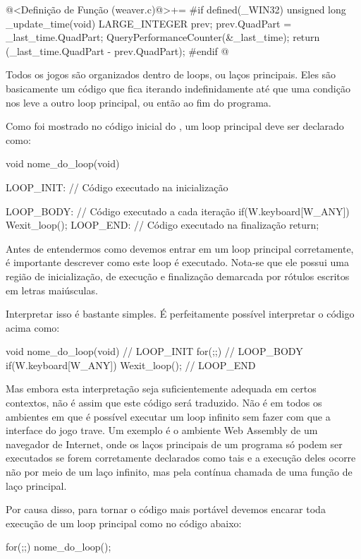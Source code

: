 \iniciocodigo
@<Definição de Função (weaver.c)@>+=
#if defined(_WIN32)
unsigned long _update_time(void){
  LARGE_INTEGER prev;
  prev.QuadPart = _last_time.QuadPart;
  QueryPerformanceCounter(&_last_time);
  return (_last_time.QuadPart - prev.QuadPart);
}
#endif
@
\fimcodigo


Todos os jogos são organizados dentro de loops, ou laços
principais. Eles são basicamente um código que fica iterando
indefinidamente até que uma condição nos leve a outro loop principal,
ou então ao fim do programa.

Como foi mostrado no código inicial do , um loop
principal deve ser declarado como:

\alinhaverbatim
void nome\_do\_loop(void){
 LOOP\_INIT: // Código executado na inicialização

 LOOP\_BODY: // Código executado a cada iteração
    if(W.keyboard[W\_ANY])
        Wexit\_loop();
 LOOP\_END: // Código executado na finalização
    return;
}
\alinhanormal

Antes de entendermos como devemos entrar em um loop principal
corretamente, é importante descrever como este loop é
executado. Nota-se que ele possui uma região de inicialização, de
execução e finalização demarcada por rótulos escritos em letras
maiúsculas.

Interpretar isso é bastante simples. É perfeitamente possível
interpretar o código acima como:

\alinhaverbatim
void nome\_do\_loop(void){
  // LOOP\_INIT
  for(;;){
    // LOOP\_BODY
    if(W.keyboard[W\_ANY])
        Wexit\_loop();
  }
  // LOOP\_END
}
\alinhanormal

Mas embora esta interpretação seja suficientemente adequada em certos
contextos, não é assim que este código será traduzido. Não é em todos
os ambientes em que é possível executar um loop infinito sem fazer com
que a interface do jogo trave. Um exemplo é o ambiente Web Assembly de
um navegador de Internet, onde os laços principais de um programa só
podem ser executados se forem corretamente declarados como tais e a
execução deles ocorre não por meio de um laço infinito, mas pela
contínua chamada de uma função de laço principal.

Por causa disso, para tornar o código mais portável devemos encarar
toda execução de um loop principal como no código abaixo:

\alinhaverbatim
for(;;)
  nome\_do\_loop();
\alinhanormal


